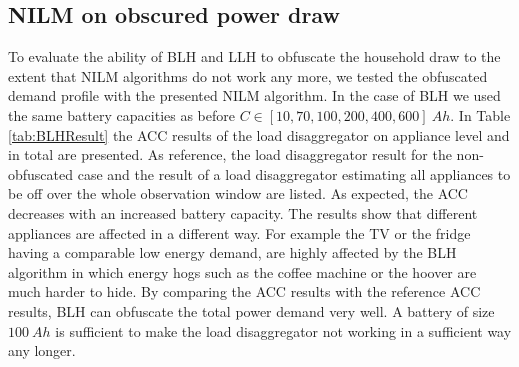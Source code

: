 \documentclass{article}
\begin{document}
\subsection{\ac{NILM} on obscured power draw}
To evaluate the ability of \ac{BLH} and \ac{LLH} to obfuscate the household draw to the extent that NILM algorithms do not work any more, we tested the obfuscated demand profile with the presented \ac{NILM} algorithm.
In the case of \ac{BLH} we used the same battery capacities as before $C \in [10,70,100,200,400,600] \: Ah$.
In Table \ref{tab:BLHResult} the \ac{ACC} results of the load disaggregator on appliance level and in total are presented. 
As reference, the load disaggregator result for the non-obfuscated case and the
result of a load disaggregator estimating all appliances to be off over the whole observation window are listed.
As expected, the \ac{ACC} decreases with an increased battery capacity. 
The results show that different appliances are affected in a different way. 
For example the TV or the fridge having a comparable low energy demand, are highly affected by the \ac{BLH} algorithm in which energy hogs such as the coffee machine or the hoover are much harder to hide.
By comparing the \ac{ACC} results with the reference \ac{ACC} results, \ac{BLH} can obfuscate the total power demand very well.
A battery of size $100\:Ah$ is sufficient to make the load disaggregator not working in a sufficient way any longer.
\end{document}
